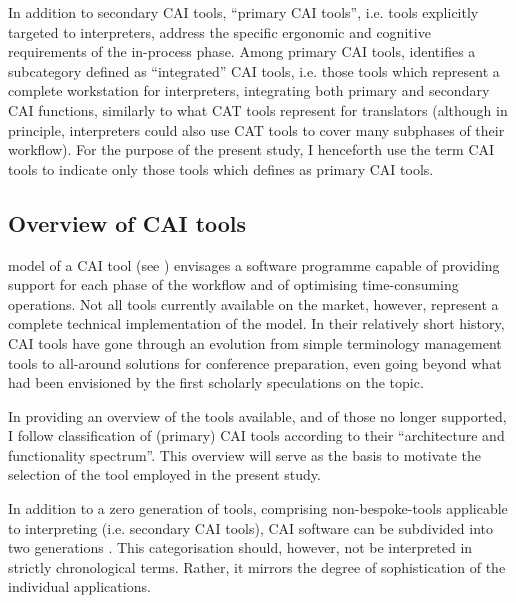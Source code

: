 In addition to secondary CAI tools, ``primary CAI tools'', i.e. tools explicitly targeted to interpreters, address the specific ergonomic and cognitive requirements of the in-process phase. Among primary CAI tools, \citet{will2020computer} identifies a subcategory defined as ``integrated'' CAI tools, i.e. those tools which represent a complete workstation for interpreters, integrating both primary and secondary CAI functions, similarly to what CAT tools represent for translators (although in principle, interpreters could also use CAT tools to cover many subphases of their workflow). For the purpose of the present study, I henceforth use the term CAI tools to indicate only those tools which \citet{will2020computer} defines as primary CAI tools.

\subsection{Overview of CAI tools} \label{CAI_overview}
 model of a CAI tool (see ) envisages a software programme capable of providing support for each phase of the workflow and of optimising time-consuming operations. Not all tools currently available on the market, however, represent a complete technical implementation of the model. In their relatively short history, CAI tools have gone through an evolution from simple terminology management tools to all-around solutions for conference preparation, even going beyond what had been envisioned by the first scholarly speculations on the topic.

In providing an overview of the tools available, and of those no longer supported, I follow  classification of (primary) CAI tools according to their ``architecture and functionality spectrum''. This overview will serve as the basis to motivate the selection of the tool employed in the present study.

In addition to a zero generation of tools, comprising non-bespoke-tools applicable to interpreting (i.e. secondary CAI tools), CAI software can be subdivided into two generations \citep{fantinuoli_interpretbank._2016,fantinuoli_computer-assisted_2018}. This categorisation should, however, not be interpreted in strictly chronological terms. Rather, it mirrors the degree of sophistication of the individual applications.

